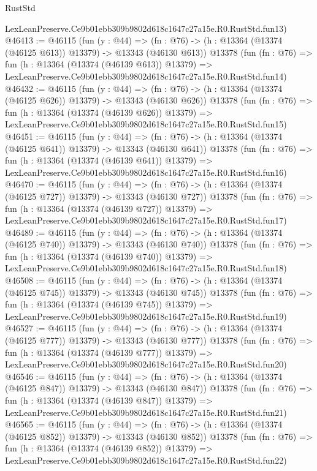\begin{lexlean}{RustStd}
\begin{coremodule}
    LexLeanPreserve.Ce9b01ebb309b9802d618c1647c27a15e.R0.RustStd.fun13)
@46413 := @46115
    (fun (y : @44) =>
    (fn : @76) -> (h : @13364 (@13374 (@46125 @613)) @13379) -> @13343 (@46130 @613))
    @13378
    (fun (fn : @76) =>
    fun (h : @13364 (@13374 (@46139 @613)) @13379) =>
    LexLeanPreserve.Ce9b01ebb309b9802d618c1647c27a15e.R0.RustStd.fun14)
@46432 := @46115
    (fun (y : @44) =>
    (fn : @76) -> (h : @13364 (@13374 (@46125 @626)) @13379) -> @13343 (@46130 @626))
    @13378
    (fun (fn : @76) =>
    fun (h : @13364 (@13374 (@46139 @626)) @13379) =>
    LexLeanPreserve.Ce9b01ebb309b9802d618c1647c27a15e.R0.RustStd.fun15)
@46451 := @46115
    (fun (y : @44) =>
    (fn : @76) -> (h : @13364 (@13374 (@46125 @641)) @13379) -> @13343 (@46130 @641))
    @13378
    (fun (fn : @76) =>
    fun (h : @13364 (@13374 (@46139 @641)) @13379) =>
    LexLeanPreserve.Ce9b01ebb309b9802d618c1647c27a15e.R0.RustStd.fun16)
@46470 := @46115
    (fun (y : @44) =>
    (fn : @76) -> (h : @13364 (@13374 (@46125 @727)) @13379) -> @13343 (@46130 @727))
    @13378
    (fun (fn : @76) =>
    fun (h : @13364 (@13374 (@46139 @727)) @13379) =>
    LexLeanPreserve.Ce9b01ebb309b9802d618c1647c27a15e.R0.RustStd.fun17)
@46489 := @46115
    (fun (y : @44) =>
    (fn : @76) -> (h : @13364 (@13374 (@46125 @740)) @13379) -> @13343 (@46130 @740))
    @13378
    (fun (fn : @76) =>
    fun (h : @13364 (@13374 (@46139 @740)) @13379) =>
    LexLeanPreserve.Ce9b01ebb309b9802d618c1647c27a15e.R0.RustStd.fun18)
@46508 := @46115
    (fun (y : @44) =>
    (fn : @76) -> (h : @13364 (@13374 (@46125 @745)) @13379) -> @13343 (@46130 @745))
    @13378
    (fun (fn : @76) =>
    fun (h : @13364 (@13374 (@46139 @745)) @13379) =>
    LexLeanPreserve.Ce9b01ebb309b9802d618c1647c27a15e.R0.RustStd.fun19)
@46527 := @46115
    (fun (y : @44) =>
    (fn : @76) -> (h : @13364 (@13374 (@46125 @777)) @13379) -> @13343 (@46130 @777))
    @13378
    (fun (fn : @76) =>
    fun (h : @13364 (@13374 (@46139 @777)) @13379) =>
    LexLeanPreserve.Ce9b01ebb309b9802d618c1647c27a15e.R0.RustStd.fun20)
@46546 := @46115
    (fun (y : @44) =>
    (fn : @76) -> (h : @13364 (@13374 (@46125 @847)) @13379) -> @13343 (@46130 @847))
    @13378
    (fun (fn : @76) =>
    fun (h : @13364 (@13374 (@46139 @847)) @13379) =>
    LexLeanPreserve.Ce9b01ebb309b9802d618c1647c27a15e.R0.RustStd.fun21)
@46565 := @46115
    (fun (y : @44) =>
    (fn : @76) -> (h : @13364 (@13374 (@46125 @852)) @13379) -> @13343 (@46130 @852))
    @13378
    (fun (fn : @76) =>
    fun (h : @13364 (@13374 (@46139 @852)) @13379) =>
    LexLeanPreserve.Ce9b01ebb309b9802d618c1647c27a15e.R0.RustStd.fun22)

\end{coremodule}
\end{lexlean}
